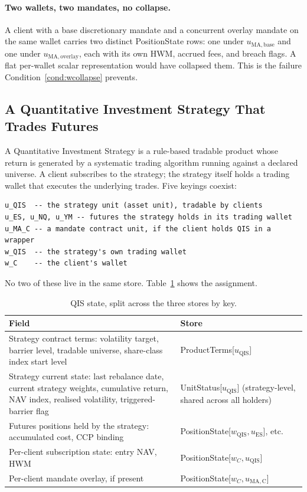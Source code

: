 \documentclass[11pt,a4paper]{article}
\begin{document}
\paragraph{Two wallets, two mandates, no collapse.} A client with a base discretionary mandate and a concurrent overlay mandate on the same wallet carries two distinct PositionState rows: one under $u_{\mathrm{MA,base}}$ and one under $u_{\mathrm{MA,overlay}}$, each with its own HWM, accrued fees, and breach flags. A flat per-wallet scalar representation would have collapsed them. This is the failure Condition~\ref{cond:wcollapse} prevents.

\subsection{A Quantitative Investment Strategy That Trades Futures}
\label{sec:qis}

A Quantitative Investment Strategy is a rule-based tradable product whose return is generated by a systematic trading algorithm running against a declared universe. A client subscribes to the strategy; the strategy itself holds a trading wallet that executes the underlying trades. Five keyings coexist:

\begin{lstlisting}
u_QIS  -- the strategy unit (asset unit), tradable by clients
u_ES, u_NQ, u_YM -- futures the strategy holds in its trading wallet
u_MA_C -- a mandate contract unit, if the client holds QIS in a wrapper
w_QIS  -- the strategy's own trading wallet
w_C    -- the client's wallet
\end{lstlisting}

\noindent No two of these live in the same store. Table~\ref{tab:qis} shows the assignment.

\begin{longtable}{p{8.5cm}p{5.5cm}}
\caption{QIS state, split across the three stores by key.}\label{tab:qis}\\
\toprule
\textbf{Field} & \textbf{Store} \\
\midrule
Strategy contract terms: volatility target, barrier level, tradable universe, share-class index start level & ProductTerms[$u_{\mathrm{QIS}}$] \\
\addlinespace
Strategy current state: last rebalance date, current strategy weights, cumulative return, NAV index, realised volatility, triggered-barrier flag & UnitStatus[$u_{\mathrm{QIS}}$] (strategy-level, shared across all holders) \\
\addlinespace
Futures positions held by the strategy: accumulated cost, CCP binding & PositionState[$w_{\mathrm{QIS}}, u_{\mathrm{ES}}$], etc. \\
\addlinespace
Per-client subscription state: entry NAV, HWM & PositionState[$w_C, u_{\mathrm{QIS}}$] \\
\addlinespace
Per-client mandate overlay, if present & PositionState[$w_C, u_{\mathrm{MA,C}}$] \\
\bottomrule
\end{longtable}
\end{document}
